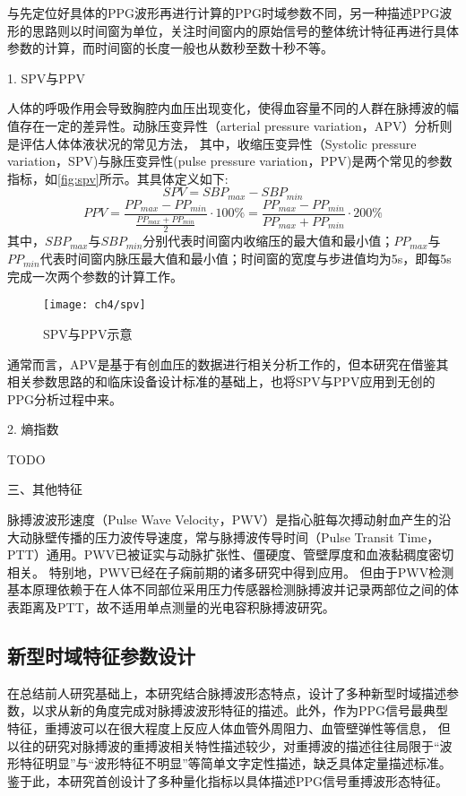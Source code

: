 与先定位好具体的PPG波形再进行计算的PPG时域参数不同，另一种描述PPG波形的思路则以时间窗为单位，关注时间窗内的原始信号的整体统计特征再进行具体参数的计算，而时间窗的长度一般也从数秒至数十秒不等。

1. SPV与PPV

人体的呼吸作用会导致胸腔内血压出现变化，使得血容量不同的人群在脉搏波的幅值存在一定的差异性。动脉压变异性（arterial pressure variation，APV）分析则是评估人体体液状况的常见方法，
其中，收缩压变异性（Systolic pressure variation，SPV)与脉压变异性(pulse pressure variation，PPV)是两个常见的参数指标\cite{GE2021,Michard1999,Perel1987,Michard2005}，如\autoref{fig:spv}所示。其具体定义如下\cite{GE2021}:
\begin{equation}
    \label{equ:spv}
    SPV=SBP_{max}-SBP_{min}
\end{equation}
\begin{equation}
    \label{equ:ppv}
    PPV=\frac{PP_{max}-PP_{min}}{\frac{PP_{max}+PP_{min}}{2}}\cdot 100\%=\frac{PP_{max}-PP_{min}}{PP_{max}+PP_{min}}\cdot 200\%
\end{equation}
其中，$SBP_{max}$与$SBP_{min}$分别代表时间窗内收缩压的最大值和最小值；$PP_{max}$与$PP_{min}$代表时间窗内脉压最大值和最小值；时间窗的宽度与步进值均为5s，即每5s完成一次两个参数的计算工作。
\begin{figure}[htbp]
    \centering
    \texttt{[image: ch4/spv]}
    \caption{\label{fig:spv}SPV与PPV示意}
\end{figure}

通常而言，APV是基于有创血压的数据进行相关分析工作的，但本研究在借鉴其相关参数思路的和临床设备设计标准的基础上，也将SPV与PPV应用到无创的PPG分析过程中来。

2. 熵指数

TODO

三、其他特征

脉搏波波形速度（Pulse Wave Velocity，PWV）是指心脏每次搏动射血产生的沿大动脉壁传播的压力波传导速度，常与脉搏波传导时间（Pulse Transit Time，PTT）通用。PWV已被证实与动脉扩张性、僵硬度、管壁厚度和血液黏稠度密切相关。
特别地，PWV已经在子痫前期的诸多研究中得到应用\cite{Tomsin2012,Katsipi2014,VivianaIvan2018,Ira2014}。
但由于PWV检测基本原理依赖于在人体不同部位采用压力传感器检测脉搏波并记录两部位之间的体表距离及PTT，故不适用单点测量的光电容积脉搏波研究。

\subsection{新型时域特征参数设计}
在总结前人研究基础上，本研究结合脉搏波形态特点，设计了多种新型时域描述参数，以求从新的角度完成对脉搏波波形特征的描述。此外，作为PPG信号最典型特征，重搏波可以在很大程度上反应人体血管外周阻力、血管壁弹性等信息，
但以往的研究对脉搏波的重搏波相关特性描述较少，对重搏波的描述往往局限于“波形特征明显”与“波形特征不明显”等简单文字定性描述，缺乏具体定量描述标准。鉴于此，本研究首创设计了多种量化指标以具体描述PPG信号重搏波形态特征。

